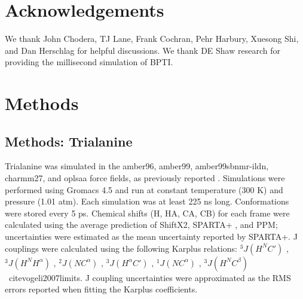 \documentclass[journal=jacsat,manuscript=article]{achemso}
\begin{document}
\section{Acknowledgements}

We thank John Chodera, TJ Lane, Frank Cochran, Pehr Harbury, Xuesong Shi, and Dan Herschlag for helpful discussions.  We thank DE Shaw research for providing the millisecond simulation of BPTI.  

\section{Methods}

\subsection{Methods: Trialanine}

Trialanine was simulated in the amber96\cite{kollman1996}, amber99\cite{wang2000}, amber99sbnmr-ildn\cite{li2010}, charmm27\cite{mackerell2004extending,bjelkmar2010implementation}, and oplsaa\cite{kaminski2001evaluation} force fields, as previously reported \cite{beauchamp2012protein}.  Simulations were performed using Gromacs 4.5 \cite{hess2008} and run at constant temperature (300 K) and pressure (1.01 atm).  Each simulation was at least 225 ns long.  Conformations were stored every 5 ps.  Chemical shifts (H, HA, CA, CB) for each frame were calculated using the average prediction of ShiftX2\cite{han2011shiftx2}, SPARTA+ \cite{Shen2010}, and PPM\cite{li2012ppm}; uncertainties were estimated as the mean uncertainty reported by SPARTA+. J couplings were calculated using the following Karplus relations: $^3J(H^N C')$ \cite{Schmidt1999}, $^3J(H^N H^\alpha)$ \cite{vogeli2007limits}, $^2J(N C^\alpha)$ \cite{Graf2007}, $^3J(H^\alpha C')$ \cite{Schmidt1999}, $^1J(N C^\alpha)$ \cite{Graf2007}, $^3J(H^N C^\beta)$ \
cite{vogeli2007limits}.  J coupling uncertainties were approximated as the RMS errors reported when fitting the Karplus coefficients.  



\end{document}
